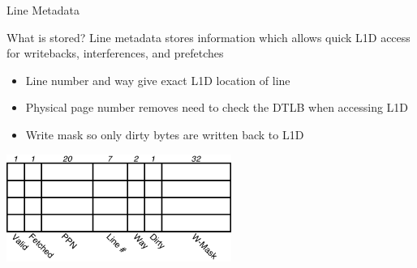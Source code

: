 \documentclass{beamer}
\begin{document}
\begin{frame}{Line Metadata}
   \begin{block}{What is stored?}
      Line metadata stores information which allows quick L1D access for
      writebacks, interferences, and prefetches
      \begin{itemize}
         \item Line number and way give exact L1D location of line
         \item Physical page number removes need to check the DTLB when accessing L1D
         \item Write mask so only dirty bytes are written back to L1D
      \end{itemize}
   \end{block}
   \begin{center}
      \includegraphics[width=0.55\textwidth]{figures/linemeta.pdf}
   \end{center}
\end{frame}
\end{document}
